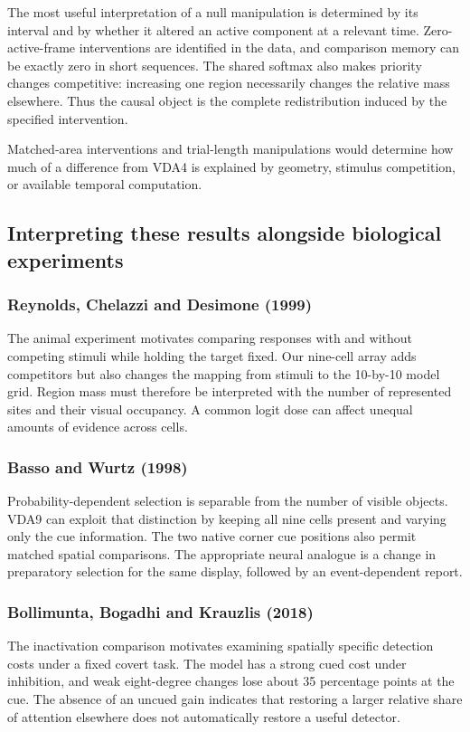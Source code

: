 \documentclass[11pt]{article}
\begin{document}
The most useful interpretation of a null manipulation is determined by its interval and by whether it altered an active component at a relevant time. Zero-active-frame interventions are identified in the data, and comparison memory can be exactly zero in short sequences. The shared softmax also makes priority changes competitive: increasing one region necessarily changes the relative mass elsewhere. Thus the causal object is the complete redistribution induced by the specified intervention.

Matched-area interventions and trial-length manipulations would determine how much of a difference from VDA4 is explained by geometry, stimulus competition, or available temporal computation.

\subsection{Interpreting these results alongside biological experiments}
\subsubsection{Reynolds, Chelazzi and Desimone (1999)}
The animal experiment motivates comparing responses with and without competing stimuli while holding the target fixed. Our nine-cell array adds competitors but also changes the mapping from stimuli to the 10-by-10 model grid. Region mass must therefore be interpreted with the number of represented sites and their visual occupancy. A common logit dose can affect unequal amounts of evidence across cells. \cite{bio_competition}

\subsubsection{Basso and Wurtz (1998)}
Probability-dependent selection is separable from the number of visible objects. VDA9 can exploit that distinction by keeping all nine cells present and varying only the cue information. The two native corner cue positions also permit matched spatial comparisons. The appropriate neural analogue is a change in preparatory selection for the same display, followed by an event-dependent report. \cite{bio_basso}

\subsubsection{Bollimunta, Bogadhi and Krauzlis (2018)}
The inactivation comparison motivates examining spatially specific detection costs under a fixed covert task. The model has a strong cued cost under inhibition, and weak eight-degree changes lose about 35 percentage points at the cue. The absence of an uncued gain indicates that restoring a larger relative share of attention elsewhere does not automatically restore a useful detector. \cite{bio_bollimunta}
\end{document}
